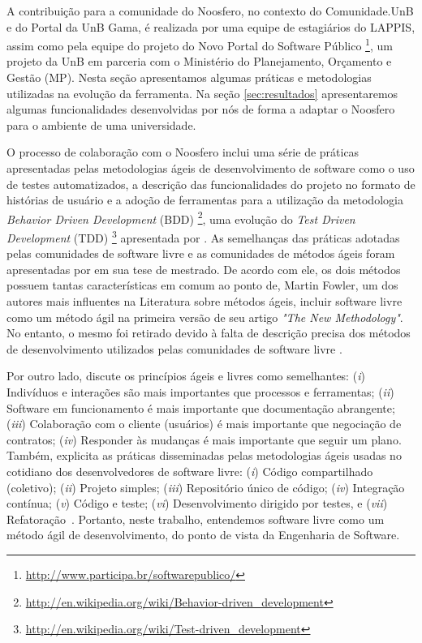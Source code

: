 \documentclass[12pt]{article}
\begin{document}
A contribuição para a comunidade do Noosfero, no contexto do Comunidade.UnB e
do Portal da UnB Gama, é realizada por uma equipe de estagiários do LAPPIS,
assim como pela equipe do projeto do Novo Portal do Software Público%
\footnote{\url{http://www.participa.br/softwarepublico/}}, um projeto da UnB
em parceria com o Ministério do Planejamento, Orçamento e Gestão (MP). Nesta
seção apresentamos algumas práticas e metodologias utilizadas na evolução da
ferramenta. Na seção \ref{sec:resultados} apresentaremos
algumas funcionalidades desenvolvidas por nós de forma a adaptar o Noosfero
para o ambiente de uma universidade.

O processo de colaboração com o Noosfero inclui uma série de práticas apresentadas
pelas metodologias ágeis de desenvolvimento de software como o uso de testes
automatizados, a descrição das funcionalidades do projeto no formato de
histórias de usuário e a adoção de ferramentas para a utilização da metodologia
\textit{Behavior Driven Development} (BDD)%
\footnote{\url{http://en.wikipedia.org/wiki/Behavior-driven_development}},
uma evolução do \textit{Test Driven Development} (TDD)%
\footnote{\url{http://en.wikipedia.org/wiki/Test-driven_development}}
apresentada por .
%
As semelhanças das práticas adotadas pelas comunidades de software livre e as
comunidades de métodos ágeis foram apresentadas por 
em sua tese de mestrado. De acordo com ele, os dois
métodos possuem tantas características em comum ao ponto de, Martin Fowler,
um dos autores mais influentes na Literatura sobre métodos ágeis,
incluir software livre como um método ágil na primeira versão de seu artigo
\textit{"The New Methodology"}. No entanto, o mesmo foi retirado devido
à falta de descrição precisa dos métodos de desenvolvimento utilizados pelas
comunidades de software livre \cite{fowler2000}.

Por outro lado,  discute os princípios ágeis e livres
como semelhantes:
%
(\textit{i}) Indivíduos e interações são mais importantes que processos e
ferramentas;
(\textit{ii}) Software em funcionamento é mais importante que documentação
abrangente;
(\textit{iii}) Colaboração com o cliente (usuários) é mais importante que
negociação de contratos;
(\textit{iv}) Responder às mudanças é mais importante que seguir um plano.
%
Também, explicita as práticas disseminadas pelas metodologias ágeis usadas no
cotidiano dos desenvolvedores de software livre:
(\textit{i}) Código compartilhado (coletivo);
(\textit{ii}) Projeto simples;
(\textit{iii}) Repositório único de código;
(\textit{iv}) Integração contínua;
(\textit{v}) Código e teste;
(\textit{vi}) Desenvolvimento dirigido por testes, e
(\textit{vii}) Refatoração~\cite{corbucci2011}. Portanto, neste trabalho,
entendemos software livre como um método ágil de desenvolvimento, do ponto de
vista da Engenharia de Software.
\end{document}
